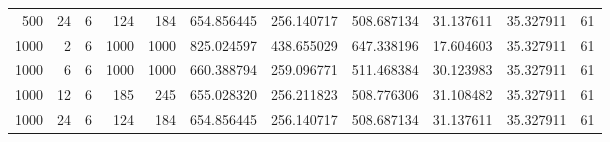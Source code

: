 \begin{table}
\begin{tabular}{rrrrrrrrrrr}
500 & 24 & 6 & 124 & 184 & 654.856445 & 256.140717 & 508.687134 & 31.137611 & 35.327911 & 61 \\
1000 & 2 & 6 & 1000 & 1000 & 825.024597 & 438.655029 & 647.338196 & 17.604603 & 35.327911 & 61 \\
1000 & 6 & 6 & 1000 & 1000 & 660.388794 & 259.096771 & 511.468384 & 30.123983 & 35.327911 & 61 \\
1000 & 12 & 6 & 185 & 245 & 655.028320 & 256.211823 & 508.776306 & 31.108482 & 35.327911 & 61 \\
1000 & 24 & 6 & 124 & 184 & 654.856445 & 256.140717 & 508.687134 & 31.137611 & 35.327911 & 61 \\
\bottomrule
\end{tabular}
\end{table}

